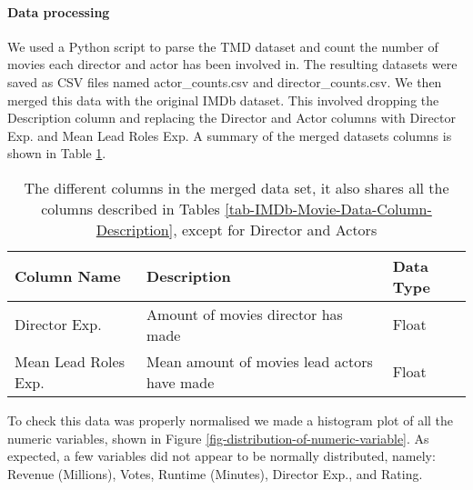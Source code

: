     \paragraph{Data processing}
        We used a Python script to parse the TMD dataset and count the number of
            movies each director and actor has been involved in.
        The resulting datasets were saved as CSV files named actor\_counts.csv and
            director\_counts.csv.
        We then merged this data with the original IMDb
            dataset.
        This involved dropping the Description column and replacing the
            Director and Actor columns with Director Exp. and Mean Lead Roles Exp.
        A summary of the merged datasets columns is shown in Table
            \ref*{tab-merged-data-column-description}.
        \begin{table}[H]
            \centering
            \begin{tabular}{lp{9cm}l}
                \toprule
                Column Name          & Description                                                  & Data Type \\
                \midrule
                Director Exp.        & Amount of movies director has made & Float     \\
                Mean Lead Roles Exp. & Mean amount of movies lead actors have made & Float     \\
                \bottomrule
            \end{tabular}
            \caption[short]{The different columns in the merged data set, 
                            it also shares all the columns described in Tables
                            \ref*{tab-IMDb-Movie-Data-Column-Description}, 
                            except for Director and Actors}\label{tab-merged-data-column-description}
        \end{table}
        To check this data was properly normalised we made a histogram plot of all the
            numeric variables, shown in Figure \ref{fig-distribution-of-numeric-variable}.
        As expected, a few variables did not appear to be normally distributed, namely:
        Revenue (Millions), Votes, Runtime (Minutes), Director Exp., and Rating.
